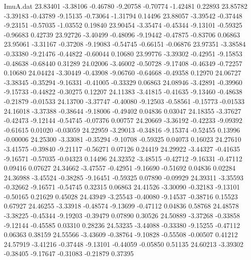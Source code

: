 \begin{filecontents}{ImuA.dat}
  23.83401   -3.38106   -0.46780   -9.20758   -0.70774   -1.42481    0.22893
  23.85782   -3.39183   -0.43789   -9.15135   -0.73064   -1.31794    0.14496
  23.88057   -3.39542   -0.37448   -9.23151   -0.57035   -1.03552    0.19840
  23.90454   -3.35474   -0.45344   -9.13101   -0.59325   -0.96683    0.42739
  23.92726   -3.40499   -0.48096   -9.19442   -0.47875   -0.83706    0.06863
  23.95061   -3.31167   -0.37208   -9.19083   -0.54745   -0.66151   -0.06876
  23.97351   -3.38584   -0.33380   -9.21476   -0.44822   -0.60044    0.10680
  23.99776   -3.39302   -0.42951   -9.15853   -0.48638   -0.68440    0.31289
  24.02006   -3.46002   -0.50728   -9.17408   -0.46349   -0.72257    0.10680
  24.04424   -3.30449   -0.43908   -9.06760   -0.64668   -0.49358    0.12970
  24.06727   -3.38345   -0.35294   -9.16331   -0.41005   -0.33329    0.06863
  24.08946   -3.42891   -0.39960   -9.15733   -0.44822   -0.30275    0.12207
  24.11383   -3.41815   -0.41635   -9.13460   -0.48638   -0.21879   -0.01533
  24.13700   -3.37747   -0.40080   -9.12503   -0.58561   -0.15773   -0.01533
  24.16018   -3.37388   -0.38644   -9.18006   -0.49402    0.04836    0.03047
  24.18355   -3.37627   -0.42473   -9.12144   -0.54745   -0.07376    0.00757
  24.20669   -3.36192   -0.42233   -9.09392   -0.61615    0.01020   -0.03059
  24.22959   -3.29013   -0.34816   -9.15374   -0.52455    0.13996   -0.00006
  24.25300   -3.33081   -0.35294   -9.10708   -0.59325    0.04073    0.16023
  24.27610   -3.41575   -0.39840   -9.21117   -0.56271    0.07126    0.24419
  24.29922   -3.44327   -0.41635   -9.16571   -0.57035   -0.04323    0.14496
  24.32352   -3.48515   -0.42712   -9.16331   -0.47112    0.09416    0.07627
  24.34662   -3.47557   -0.42951   -9.16690   -0.51692    0.04836    0.02284
  24.36988   -3.45524   -0.38285   -9.16451   -0.59325    0.07890   -0.09929
  24.39311   -3.35593   -0.32662   -9.16571   -0.54745    0.32315    0.06863
  24.41526   -3.30090   -0.32183   -9.13101   -0.50165    0.21629    0.45028
  24.43949   -3.25543   -0.40080   -9.14537   -0.38716    0.15523    0.67927
  24.46255   -3.33918   -0.48574   -9.13699   -0.47112    0.04836    0.58768
  24.48578   -3.38225   -0.45344   -9.19203   -0.39479    0.07890    0.30526
  24.50889   -3.37268   -0.33858   -9.12144   -0.45585    0.03310    0.28236
  24.53235   -3.44088   -0.33380   -9.15255   -0.47112    0.06363    0.38159
  24.55566   -3.43609   -0.38764   -9.10828   -0.55508   -0.00507    0.41212
  24.57919   -3.41216   -0.37448   -9.13101   -0.44059   -0.05850    0.51135
  24.60213   -3.39302   -0.38405   -9.17647   -0.31083   -0.21879    0.37395

\end{filecontents}
